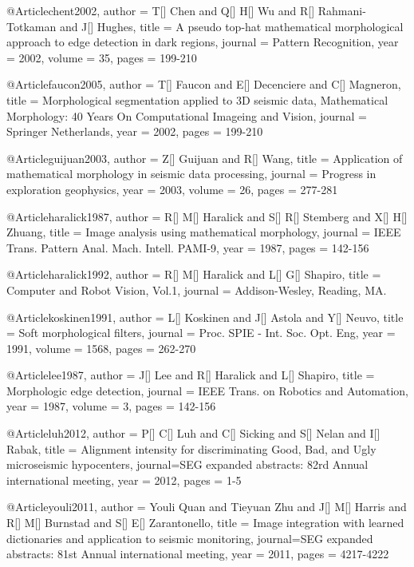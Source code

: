     @Article{chent2002,
  author = 	 {T[] Chen and Q[] H[] Wu and R[] Rahmani-Totkaman and J[] Hughes},
  title = 	 {A pseudo top-hat mathematical
morphological approach to edge detection in dark regions},
  journal = 	 {Pattern Recognition},
  year = 	 2002,
  volume = 	 35,
  pages = 	 {199-210}}   
  
@Article{faucon2005,
  author = 	 {T[] Faucon and E[] Decenciere and C[] Magneron},
  title = 	 {Morphological segmentation applied to 3{D} seismic data, Mathematical Morphology: 40 Years On Computational Imageing and Vision},
  journal = 	 {Springer Netherlands},
  year = 	 2002,
  pages = 	 {199-210}}      
  
    @Article{guijuan2003,
  author = 	 {Z[] Guijuan and R[] Wang},
  title = 	 {Application of mathematical morphology in seismic data processing},
  journal = 	 {Progress in exploration geophysics},
  year = 	 2003,
  volume = 	 26,
  pages = 	 {277-281}}     
   
@Article{haralick1987,
  author = 	 {R[] M[] Haralick and S[] R[] Stemberg and X[] H[] Zhuang},
  title = 	 {Image analysis using mathematical morphology},
  journal = 	 {IEEE Trans. Pattern Anal. Mach. Intell. PAMI-9},
  year = 	 1987,
  pages = 	 {142-156}}    
  
@Article{haralick1992,
  author = 	 {R[] M[] Haralick and L[] G[] Shapiro},
  title = 	 {Computer and Robot Vision, Vol.1},
  journal = 	 {Addison-Wesley, Reading,
MA.}}   
  
   @Article{koskinen1991,
  author = 	 {L[] Koskinen and J[] Astola and Y[] Neuvo},
  title = 	 {Soft morphological filters},
  journal = 	 {Proc. SPIE - Int. Soc. Opt. Eng},
  year = 	 1991,
    volume = 	 1568,
  pages = 	 {262-270}}     
  
     @Article{lee1987,
  author = 	 {J[] Lee and R[] Haralick and L[] Shapiro},
  title = 	 {Morphologic edge detection},
  journal = 	 {IEEE Trans. on Robotics and
Automation},
  year = 	 1987,
  volume = 	 3,
  pages = 	 {142-156}}   

     @Article{luh2012,
  author = 	 {P[] C[] Luh and C[] Sicking and S[] Nelan and I[] Rabak},
  title = 	 {Alignment intensity for discriminating Good, Bad, and Ugly microseismic hypocenters},
  journal={SEG expanded abstracts: 82rd Annual international meeting},
  year = 	 2012,
  pages = 	 {1-5}}  

     @Article{youli2011,
  author = 	 {Youli Quan and Tieyuan Zhu and J[] M[] Harris and R[] M[] Burnstad and S[] E[] Zarantonello},
  title = 	 {Image integration with learned dictionaries and application to seismic monitoring},
  journal={SEG expanded abstracts: 81st Annual international meeting},
  year = 	 2011,
  pages = 	 {4217-4222}} 
    
